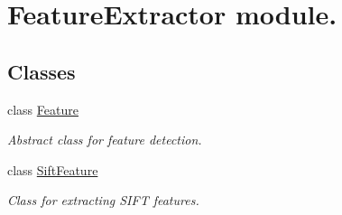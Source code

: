 \hypertarget{group___feature_extractor}{\section{Feature\-Extractor module.}
\label{group___feature_extractor}
}
\subsection*{Classes}
\begin{DoxyCompactItemize}
\item 
class \hyperlink{class_feature}{Feature}
\begin{DoxyCompactList}\small\item\em Abstract class for feature detection. \end{DoxyCompactList}\item 
class \hyperlink{class_sift_feature}{Sift\-Feature}
\begin{DoxyCompactList}\small\item\em Class for extracting S\-I\-F\-T features. \end{DoxyCompactList}\end{DoxyCompactItemize}
